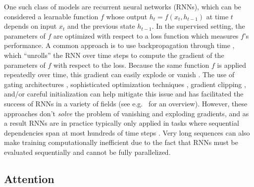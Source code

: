 \documentclass{article} %
\begin{document}
One such class of models are recurrent neural networks (RNNs), which can be considered a learnable function $f$ whose output $h_t = f(x_t, h_{t - 1})$ at time $t$ depends on input $x_t$ and the previous state $h_{t - 1}$.
In the supervised setting, the parameters of $f$ are optimized with respect to a loss function which measures $f$'s performance.
A common approach is to use backpropagation through time \cite{werbos1990backpropagation}, which ``unrolls'' the RNN over time steps to compute the gradient of the parameters of $f$ with respect to the loss.
Because the same function $f$ is applied repeatedly over time, this gradient can easily explode or vanish \cite{pascanu2012difficulty,hochreiter1997long,bengio1994learning}.
The use of gating architectures \cite{hochreiter1997long,cho2014learning}, sophisticated optimization techniques \cite{martens2011learning,sutskever2013importance}, gradient clipping \cite{pascanu2012difficulty,graves2013generating}, and/or careful initialization \cite{sutskever2013importance,jaegar2012long,mikolov2014learning,le2015simple} can help mitigate this issue and has facilitated the success of RNNs in a variety of fields (see e.g.\ \cite{graves2012supervised,cho2015describing} for an overview).
However, these approaches don't \textit{solve} the problem of vanishing and exploding gradients, and as a result RNNs are in practice typically only applied in tasks where sequential dependencies span at most hundreds of time steps \cite{martens2011learning,sutskever2013importance,le2015simple,hochreiter1997long}.
Very long sequences can also make training computationally inefficient due to the fact that RNNs must be evaluated sequentially and cannot be fully parallelized.

\subsection{Attention}
\end{document}

